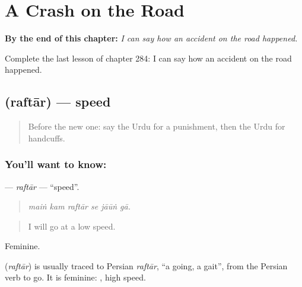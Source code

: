 
\chapter{A Crash on the Road}
\label{ch:ur-a-crash-on-the-road}

\begin{chapteropening}
\textbf{By the end of this chapter:} \emph{I can say how an accident on the road happened.}

Complete the last lesson of chapter 284: I can say how an accident on the road happened.
\end{chapteropening}

\section[\texorpdfstring{\ur{رفتار} (raftār)}{رفتار (raftār)}]{ (raftār) — speed}

\label{lesson:UR-C284-raftar}



\begin{quote}
Before the new one: say the Urdu for a punishment, then the Urdu for handcuffs.
\end{quote}

\subsection*{You'll want to know: }
\textbf{} — \emph{raftār} — \textquotedblleft{}speed\textquotedblright{}.

\begin{quote}
     
\end{quote}

\begin{quote}
\emph{maiṅ kam raftār se jāūṅ gā.}
\end{quote}

\begin{quote}
I will go at a low speed.
\end{quote}

Feminine.

\begin{cousinweb}
\textbf{} (\emph{raftār}) is usually traced to Persian \emph{raftār}, \textquotedblleft{}a going, a gait\textquotedblright{}, from the Persian verb to go. It is feminine: \textbf{ }, high speed.
\end{cousinweb}

